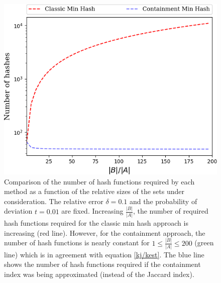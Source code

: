 \documentclass[11pt,reqno]{amsart}
\theoremstyle{remark}
\numberwithin{equation}{section}
\begin{document}
\begin{figure}[!h]%
\begin{center}
\includegraphics[width=\linewidth,trim={0 0 0 0in},clip]{Figs/increasingRatioWithCont2.png}
\end{center}
\caption{Comparison of the number of hash functions required by each method as a function of the relative sizes of the sets under consideration. The relative error $\delta=0.1$ and the probability of deviation $t=0.01$ are fixed. Increasing $\frac{|B|}{|A|}$, the number of required hash functions required for the classic min hash approach is increasing (red line). However, for the containment approach, the number of hash functions is nearly constant for $1\leq\frac{|B|}{|A|}\leq 200$ (green line) which is in agreement with equation \ref{kj/kest}. The blue line shows the number of hash functions required if the containment index was being approximated (instead of the Jaccard index).}
\label{Kratio}%
\end{figure}


\end{document}
